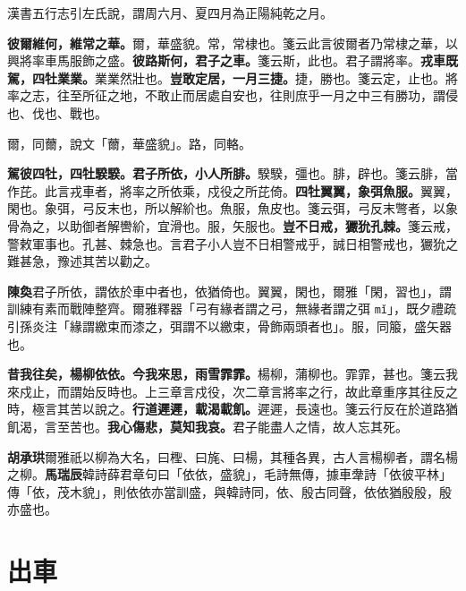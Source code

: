 \begin{quoting}漢書五行志引左氏說，謂周六月、夏四月為正陽純乾之月。\end{quoting}

\textbf{彼爾維何，維常之華。}{\footnotesize 爾，華盛貌。常，常棣也。箋云此言彼爾者乃常棣之華，以興將率車馬服飾之盛。}\textbf{彼路斯何，君子之車。}{\footnotesize 箋云斯，此也。君子謂將率。}\textbf{戎車既駕，四牡業業。}{\footnotesize 業業然壯也。}\textbf{豈敢定居，一月三捷。}{\footnotesize 捷，勝也。箋云定，止也。將率之志，往至所征之地，不敢止而居處自安也，往則庶乎一月之中三有勝功，謂侵也、伐也、戰也。}

\begin{quoting}爾，同薾，說文「薾，華盛貌」。路，同輅。\end{quoting}

\textbf{駕彼四牡，四牡騤騤。君子所依，小人所腓。}{\footnotesize 騤騤，彊也。腓，辟也。箋云腓，當作芘。此言戎車者，將率之所依乘，戍役之所芘倚。}\textbf{四牡翼翼，象弭魚服。}{\footnotesize 翼翼，閑也。象弭，弓反末也，所以解紒也。魚服，魚皮也。箋云弭，弓反末彆者，以象骨為之，以助御者解轡紒，宜滑也。服，矢服也。}\textbf{豈不日戒，玁狁孔棘。}{\footnotesize 箋云戒，警敕軍事也。孔甚、棘急也。言君子小人豈不日相警戒乎，誠日相警戒也，玁狁之難甚急，豫述其苦以勸之。}

\begin{quoting}\textbf{陳奐}君子所依，謂依於車中者也，依猶倚也。翼翼，閑也，爾雅「閑，習也」，謂訓練有素而戰陣整齊。爾雅釋器「弓有緣者謂之弓，無緣者謂之弭 \texttt{mǐ}」，既夕禮疏引孫炎注「緣謂繳束而漆之，弭謂不以繳束，骨飾兩頭者也」。服，同箙，盛矢器也。\end{quoting}

\textbf{昔我往矣，楊柳依依。今我來思，雨雪霏霏。}{\footnotesize 楊柳，蒲柳也。霏霏，甚也。箋云我來戍止，而謂始反時也。上三章言戍役，次二章言將率之行，故此章重序其往反之時，極言其苦以說之。}\textbf{行道遲遲，載渴載飢。}{\footnotesize 遲遲，長遠也。箋云行反在於道路猶飢渴，言至苦也。}\textbf{我心傷悲，莫知我哀。}{\footnotesize 君子能盡人之情，故人忘其死。}

\begin{quoting}\textbf{胡承珙}爾雅祇以柳為大名，曰檉、曰旄、曰楊，其種各異，古人言楊柳者，謂名楊之柳。\textbf{馬瑞辰}韓詩薛君章句曰「依依，盛貌」，毛詩無傳，據車舝詩「依彼平林」傳「依，茂木貌」，則依依亦當訓盛，與韓詩同，依、殷古同聲，依依猶殷殷，殷亦盛也。\end{quoting}

\section{出車}

